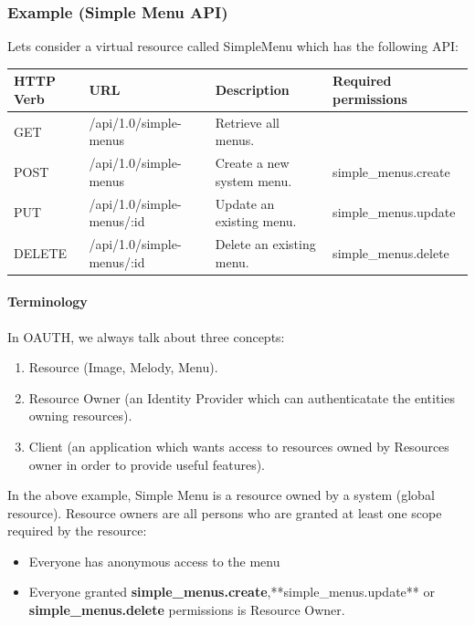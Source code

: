 \documentclass[letterpaper,10pt,english]{sphinxmanual}
\begin{document}
\subsubsection{Example (Simple Menu API)}
\label{features/oauth2/simple_api_example::doc}\label{features/oauth2/simple_api_example:example-simple-menu-api}
Lets consider a virtual resource called SimpleMenu which has the following API:

\begin{tabulary}{\linewidth}{|L|L|L|L|}
\hline

\textbf{HTTP Verb}
 & 
\textbf{URL}
 & 
\textbf{Description}
 & 
\textbf{Required permissions}
\\\hline

GET
 & 
/api/1.0/simple-menus
 & 
Retrieve all menus.
 & \\\hline

POST
 & 
/api/1.0/simple-menus
 & 
Create a new system menu.
 & 
simple\_menus.create
\\\hline

PUT
 & 
/api/1.0/simple-menus/:id
 & 
Update an existing menu.
 & 
simple\_menus.update
\\\hline

DELETE
 & 
/api/1.0/simple-menus/:id
 & 
Delete an existing menu.
 & 
simple\_menus.delete
\\\hline
\end{tabulary}



\paragraph{Terminology}
\label{features/oauth2/simple_api_example:terminology}
In OAUTH, we always talk about three concepts:
\begin{enumerate}
\item {} 
Resource (Image, Melody, Menu).

\item {} 
Resource Owner (an Identity Provider which can authenticatate the entities owning resources).

\item {} 
Client (an application which wants access to resources owned by Resources owner in order to provide useful features).

\end{enumerate}

In the above example, Simple Menu is a resource owned by a system (global resource). Resource owners are all persons who
are granted at least one scope required by the resource:
\begin{itemize}
\item {} 
Everyone has anonymous access to the menu

\item {} 
Everyone granted \textbf{simple\_menus.create},**simple\_menus.update** or \textbf{simple\_menus.delete} permissions is Resource Owner.

\end{itemize}
\end{document}
